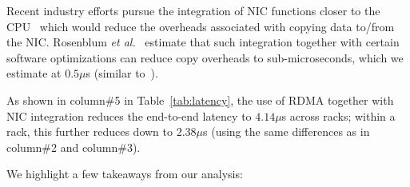 Recent industry efforts pursue the integration of NIC functions closer to the CPU~\cite{cpu-nic} which would reduce the overheads associated with copying data to/from the NIC. Rosenblum {\it et al.}~\cite{lowlatency} estimate that such integration together with certain software  optimizations can reduce copy overheads to sub-microseconds, which we estimate at $0.5\mu$s (similar to~\cite{lowlatency}). 

As shown in column\#5 in Table~\ref{tab:latency}, the use of RDMA together with NIC integration reduces the end-to-end latency to $4.14\mu$s across racks; within a rack, this further reduces down to $2.38\mu$s (using the same differences as in column\#2 and column\#3).

 We highlight a few takeaways from our analysis:

